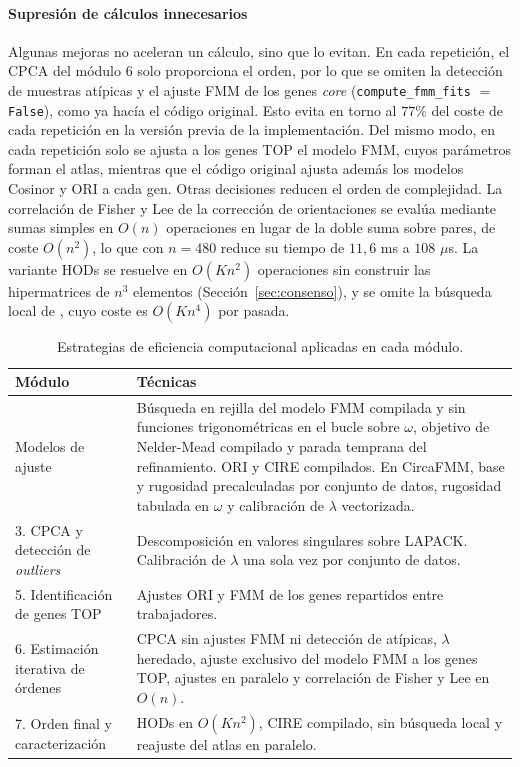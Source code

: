 \documentclass[12pt, a4paper]{report}
\begin{document}
\paragraph{Supresión de cálculos innecesarios}
Algunas mejoras no aceleran un cálculo, sino que lo evitan. En cada repetición, el CPCA del módulo 6 solo proporciona el orden, por lo que se omiten la detección de muestras atípicas y el ajuste FMM de los genes \textit{core} (\texttt{compute\_fmm\_fits} \(=\) \texttt{False}), como ya hacía el código original. Esto evita en torno al \(77\%\) del coste de cada repetición en la versión previa de la implementación. Del mismo modo, en cada repetición solo se ajusta a los genes TOP el modelo FMM, cuyos parámetros forman el atlas, mientras que el código original ajusta además los modelos Cosinor y ORI a cada gen. Otras decisiones reducen el orden de complejidad. La correlación de Fisher y Lee de la corrección de orientaciones se evalúa mediante sumas simples en \(O(n)\) operaciones en lugar de la doble suma sobre pares, de coste \(O(n^2)\), lo que con \(n=480\) reduce su tiempo de \(11{,}6\) ms a \(108\) \(\mu\)s. La variante HODs se resuelve en \(O(Kn^2)\) operaciones sin construir las hipermatrices de \(n^3\) elementos (Sección~\ref{sec:consenso}), y se omite la búsqueda local de \citet{barragan2015}, cuyo coste es \(O(Kn^4)\) por pasada.

\begin{table}[H]
\centering
\small
\caption{Estrategias de eficiencia computacional aplicadas en cada módulo.}
\label{tab:eficiencia}
\begin{tabular}{p{3.2cm}p{11.2cm}}
\hline
Módulo & Técnicas \\
\hline
Modelos de ajuste & Búsqueda en rejilla del modelo FMM compilada y sin funciones trigonométricas en el bucle sobre \(\omega\), objetivo de Nelder-Mead compilado y parada temprana del refinamiento. ORI y CIRE compilados. En CircaFMM, base y rugosidad precalculadas por conjunto de datos, rugosidad tabulada en \(\omega\) y calibración de \(\lambda\) vectorizada. \\[1mm]
3. CPCA y detección de \textit{outliers} & Descomposición en valores singulares sobre LAPACK. Calibración de \(\lambda\) una sola vez por conjunto de datos. \\[1mm]
5. Identificación de genes TOP & Ajustes ORI y FMM de los genes repartidos entre trabajadores. \\[1mm]
6. Estimación iterativa de órdenes & CPCA sin ajustes FMM ni detección de atípicas, \(\lambda\) heredado, ajuste exclusivo del modelo FMM a los genes TOP, ajustes en paralelo y correlación de Fisher y Lee en \(O(n)\). \\[1mm]
7. Orden final y caracterización & HODs en \(O(Kn^2)\), CIRE compilado, sin búsqueda local y reajuste del atlas en paralelo. \\
\hline
\end{tabular}
\end{table}
\end{document}
